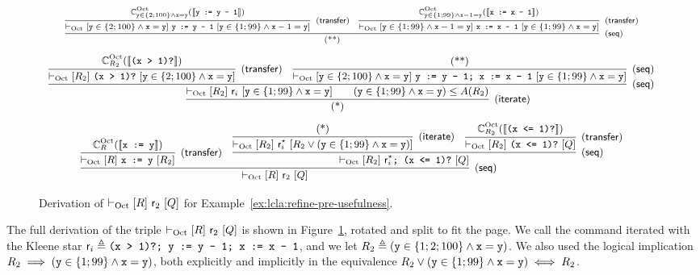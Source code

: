 \begin{sidewaysfigure}
	\[
	\text{\scriptsize
		\infer[(\mathsf{seq})]
		{ ($**$) }
		{
			\infer[(\mathsf{transfer})]
			{ \lcl{\Oct}{\code{y} \in \{2; 100\} \land \code{x} = \code{y}}{\code{y := y - 1}}{ \code{y} \in \{1; 99\} \land \code{x} - 1 = \code{y} } }
			{ \complete{\Oct}{\code{y} \in \{2; 100\} \land \code{x} = \code{y}}{\denot{\code{y := y - 1}}} }
			&
			\infer[(\mathsf{transfer})]
			{ \lcl{\Oct}{ \code{y} \in \{1; 99\} \land \code{x} - 1 = \code{y} }{\code{x := x - 1}}{\code{y} \in \{1; 99\} \land \code{x} = \code{y}} }
			{ \complete{\Oct}{\code{y} \in \{1; 99\} \land \code{x} - 1 = \code{y}}{\denot{\code{x := x - 1}}} }
		}
	}
	\]
	\[
	\text{\small
		\infer[(\mathsf{iterate})]
		{ ($*$) }
		{
			\infer[(\mathsf{seq})]
			{ \lcl{\Oct}{R_2}{\regr_i}{\code{y} \in \{1; 99\} \land \code{x} = \code{y}}
				\qquad (\code{y} \in \{1; 99\} \land \code{x} = \code{y}) \le A(R_2) }
			{
				\infer[(\mathsf{transfer})]
				{ \lcl{\Oct}{R_2}{\code{(x > 1)?}}{\code{y} \in \{2; 100\} \land \code{x} = \code{y}} }
				{ \complete{\Oct}{R_2}{\denot{\code{(x > 1)?}}}}
				&
				\infer[(\mathsf{seq})]
				{ \lcl{\Oct}{\code{y} \in \{2; 100\} \land \code{x} = \code{y}}{\code{y := y - 1; x := x - 1}}{\code{y} \in \{1; 99\} \land \code{x} = \code{y}} }
				{ ($**$) }
			}
		}
	}
	\]
	\[
	\text{\small
		\infer[(\mathsf{seq})]
		{\lcl{\Oct}{R}{\regr_2}{Q}
		}
		{
			\infer[(\mathsf{transfer})]
			{\lcl{\Oct}{R}{\code{x := y}}{R_2}}{ \complete{\Oct}{R}{\denot{\code{x := y}}} }
			&
			\infer[(\mathsf{seq})]
			{\lcl{\Oct}{R_2}{\regr_i^{\kstar}\code{; (x <= 1)?}}{Q}}
			{
				\infer[(\mathsf{iterate})]
				{\lcl{\Oct}{R_2}{\regr_i^{\kstar}}{R_2 \lor (\code{y} \in \{1; 99\} \land \code{x} = \code{y})}}
				{ ($*$) }
				&
				\infer[(\mathsf{transfer})]
				{\lcl{\Oct}{R_2}{\code{(x <= 1)?}}{Q}}{ \complete{\Oct}{R_2}{\denot{\code{(x <= 1)?}}} }
			}
		}
	}
	\]
	\caption{Derivation of $\vdash_{\text{Oct}}\nobreak[R]~\mathsf{r}_2~[Q]$ for Example~\ref{ex:lcla:refine-pre-usefulness}.}\label{fig:app:ex-refine-pre-derivation-2}
\end{sidewaysfigure}

\begin{example}
	The full derivation of the triple $\vdash_{\text{Oct}}\nobreak[R]~\mathsf{r}_2~[Q]$ is shown in Figure~\ref{fig:app:ex-refine-pre-derivation-2}, rotated and split to fit the page. We call the command iterated with the Kleene star $\mathsf{r}_i \triangleq \texttt{(x > 1)?; y := y - 1; x := x - 1}$, and we let $R_2 \triangleq (\texttt{y} \in \{1; 2; 100\} \land \texttt{x} = \texttt{y})$. We also used the logical implication $R_2 \implies (\texttt{y} \in \{1; 99\} \land \texttt{x} = \texttt{y})$, both explicitly and implicitly in the equivalence $R_2 \lor (\texttt{y} \in \{1; 99\} \land \texttt{x} = \texttt{y}) \iff R_2$.
\end{example}

